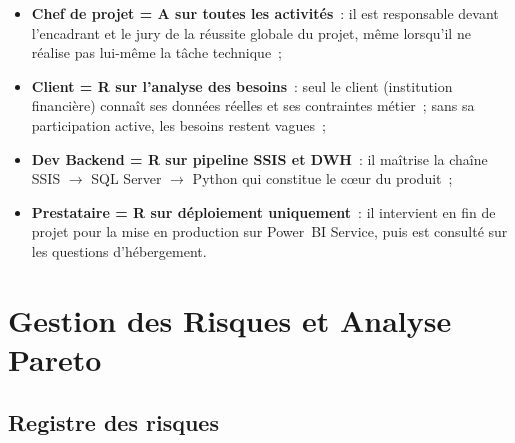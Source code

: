 \documentclass[12pt, a4paper]{report}
\begin{document}
\begin{itemize}[leftmargin=1.5em]
  \item \textbf{Chef de projet = A sur toutes les activités}~: il est responsable
    devant l'encadrant et le jury de la réussite globale du projet, même lorsqu'il
    ne réalise pas lui-même la tâche technique~;
  \item \textbf{Client = R sur l'analyse des besoins}~: seul le client (institution
    financière) connaît ses données réelles et ses contraintes métier~; sans sa
    participation active, les besoins restent vagues~;
  \item \textbf{Dev Backend = R sur pipeline SSIS et DWH}~: il maîtrise la chaîne
    SSIS $\to$ SQL Server $\to$ Python qui constitue le cœur du produit~;
  \item \textbf{Prestataire = R sur déploiement uniquement}~: il intervient en fin
    de projet pour la mise en production sur Power~BI Service, puis est consulté
    sur les questions d'hébergement.
\end{itemize}

\section{Gestion des Risques et Analyse Pareto}

\subsection{Registre des risques}
\end{document}

